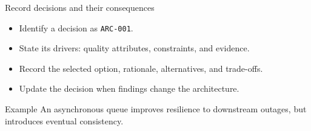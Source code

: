 \begin{frame}{Record decisions and their consequences}
\begin{itemize}
  \item Identify a decision as \texttt{ARC-001}.
  \item State its drivers: quality attributes, constraints, and evidence.
  \item Record the selected option, rationale, alternatives, and trade-offs.
  \item Update the decision when findings change the architecture.
\end{itemize}
\begin{slidecallout}{Example}
An asynchronous queue improves resilience to downstream outages, but introduces eventual consistency.
\end{slidecallout}
\end{frame}
